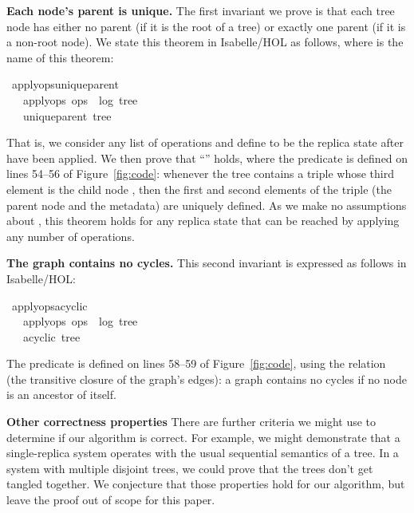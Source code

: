 \documentclass[10pt,journal,compsoc]{IEEEtran}
\renewenvironment{isabelle}{%
  \medbreak\indent%
  \renewcommand{\isanewline}{\\}%
  \begin{minipage}{\columnwidth}%
  \begin{isabellebody}%
  \begin{tabbing}%
}{%
  \end{tabbing}%
  \end{isabellebody}%
  \end{minipage}%
  \medbreak%
}
\renewcommand{\isacartoucheopen}{}
\renewcommand{\isacartoucheclose}{}
\begin{document}
\smallbreak\noindent\textbf{Each node's parent is unique.}
The first invariant we prove is that each tree node has either no parent (if it is the root of a tree) or exactly one parent (if it is a non-root node).
We state this theorem in Isabelle/HOL as follows, where  is the name of this theorem:
\begin{isabelle}
\isamarkupfalse%
\ apply{\isacharunderscore}ops{\isacharunderscore}unique{\isacharunderscore}parent{\isacharcolon}\isanewline
\ \ \ {\isacartoucheopen}apply{\isacharunderscore}ops\ ops\ {\isacharequal}\ {\isacharparenleft}log{\isacharcomma}\ tree{\isacharparenright}{\isacartoucheclose}\isanewline
\ \ \ {\isacartoucheopen}unique{\isacharunderscore}parent\ tree{\isacartoucheclose}
\end{isabelle}
\noindent That is, we consider any list of operations  and define  to be the replica state after  have been applied.
We then prove that ``'' holds, where the  predicate is defined on lines 54--56 of Figure~\ref{fig:code}: whenever the tree contains a triple whose third element is the child node , then the first and second elements of the triple (the parent node and the metadata) are uniquely defined.
As we make no assumptions about , this theorem holds for any replica state that can be reached by applying any number of operations.

\smallbreak\noindent\textbf{The graph contains no cycles.}
This second invariant is expressed as follows in Isabelle/HOL:
\begin{isabelle}
\isamarkupfalse%
\ apply{\isacharunderscore}ops{\isacharunderscore}acyclic{\isacharcolon}\isanewline
\ \ \ {\isacartoucheopen}apply{\isacharunderscore}ops\ ops\ {\isacharequal}\ {\isacharparenleft}log{\isacharcomma}\ tree{\isacharparenright}{\isacartoucheclose}\isanewline
\ \ \ {\isacartoucheopen}acyclic\ tree{\isacartoucheclose}
\end{isabelle}
\noindent The  predicate is defined on lines 58--59 of Figure~\ref{fig:code}, using the  relation (the transitive closure of the graph's edges): a graph contains no cycles if no node is an ancestor of itself.

\smallbreak\noindent\textbf{Other correctness properties}
There are further criteria we might use to determine if our algorithm is correct.
For example, we might demonstrate that a single-replica system operates with the usual sequential semantics of a tree.
In a system with multiple disjoint trees, we could prove that the trees don't get tangled together.
We conjecture that those properties hold for our algorithm, but leave the proof out of scope for this paper.
\end{document}

